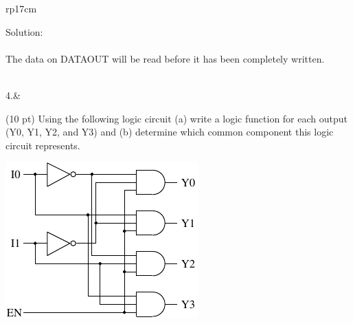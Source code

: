 \documentclass{article}
\begin{document}
\begin{longtable}[l]{rp{17cm}}
\begin{minipage}[t]{\linewidth}
Solution: \\ \\
The data on DATAOUT will be read before it has been completely written.
\end{minipage}\\
\medskip
4.&\begin{minipage}[t]{\linewidth}(10 pt) Using the following logic circuit (a) write a logic function for each output (Y0, Y1, Y2, and Y3) and (b) determine which common component this logic circuit represents.\\
\begin{center}
  \includegraphics{../Decoders/Assessments/2to4BinaryDecoderLogic} \\
\end{center}


\end{minipage}
\end{longtable}
\end{document}
